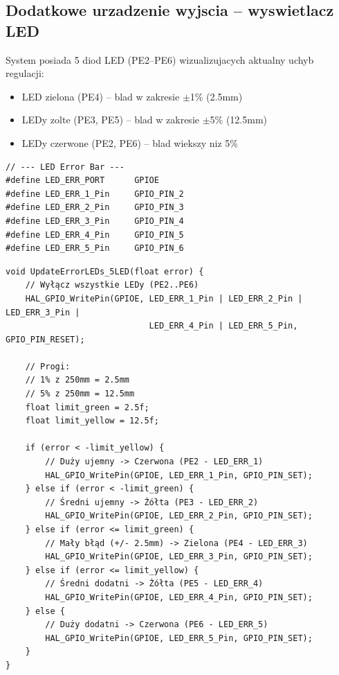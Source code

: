 \documentclass[11pt]{article}
\begin{document}
\subsection{Dodatkowe urzadzenie wyjscia -- wyswietlacz LED}

System posiada 5 diod LED (PE2--PE6) wizualizujacych aktualny uchyb regulacji:
\begin{itemize}
    \item LED zielona (PE4) -- blad w zakresie $\pm$1\% (2.5mm)
    \item LEDy zolte (PE3, PE5) -- blad w zakresie $\pm$5\% (12.5mm)
    \item LEDy czerwone (PE2, PE6) -- blad wiekszy niz 5\%
\end{itemize}

\begin{lstlisting}[caption={Definicje pinow LED (main.h)}, style=cstyle]
// --- LED Error Bar ---
#define LED_ERR_PORT      GPIOE
#define LED_ERR_1_Pin     GPIO_PIN_2
#define LED_ERR_2_Pin     GPIO_PIN_3
#define LED_ERR_3_Pin     GPIO_PIN_4
#define LED_ERR_4_Pin     GPIO_PIN_5
#define LED_ERR_5_Pin     GPIO_PIN_6
\end{lstlisting}

\begin{lstlisting}[caption={Update stanu ledów (leds.c)}, style=cstyle]
void UpdateErrorLEDs_5LED(float error) {
	// Wyłącz wszystkie LEDy (PE2..PE6)
	HAL_GPIO_WritePin(GPIOE, LED_ERR_1_Pin | LED_ERR_2_Pin | LED_ERR_3_Pin | 
	                         LED_ERR_4_Pin | LED_ERR_5_Pin, GPIO_PIN_RESET);
	
	// Progi: 
	// 1% z 250mm = 2.5mm
	// 5% z 250mm = 12.5mm
	float limit_green = 2.5f;
	float limit_yellow = 12.5f;
	
	if (error < -limit_yellow) {
		// Duży ujemny -> Czerwona (PE2 - LED_ERR_1)
		HAL_GPIO_WritePin(GPIOE, LED_ERR_1_Pin, GPIO_PIN_SET);
	} else if (error < -limit_green) {
		// Średni ujemny -> Żółta (PE3 - LED_ERR_2)
		HAL_GPIO_WritePin(GPIOE, LED_ERR_2_Pin, GPIO_PIN_SET);
	} else if (error <= limit_green) { 
		// Mały błąd (+/- 2.5mm) -> Zielona (PE4 - LED_ERR_3)
		HAL_GPIO_WritePin(GPIOE, LED_ERR_3_Pin, GPIO_PIN_SET);
	} else if (error <= limit_yellow) {
		// Średni dodatni -> Żółta (PE5 - LED_ERR_4)
		HAL_GPIO_WritePin(GPIOE, LED_ERR_4_Pin, GPIO_PIN_SET);
	} else {
		// Duży dodatni -> Czerwona (PE6 - LED_ERR_5)
		HAL_GPIO_WritePin(GPIOE, LED_ERR_5_Pin, GPIO_PIN_SET);
	}
}
\end{lstlisting}
\end{document}
